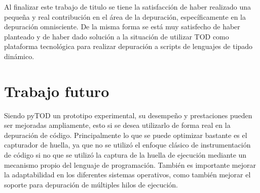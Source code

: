 \documentclass[12pt,legalpaper]{report}
\begin{document}
Al finalizar este trabajo de titulo se tiene la satisfacción de haber realizado una pequeña y real contribución en el área de la depuración, específicamente en la depuración omnisciente.  De la misma forma se está muy satisfecho de haber planteado y de haber dado solución a la situación de utilizar TOD como plataforma tecnológica para realizar depuración a scripts de lenguajes de tipado dinámico.

\chapter{Trabajo futuro}

Siendo pyTOD un prototipo experimental, su desempeño y prestaciones pueden ser mejoradas ampliamente, esto si se desea utilizarlo de forma real en la depuración de código.  Principalmente lo que se puede optimizar bastante es el capturador de huella, ya que no se utilizó el enfoque clásico de instrumentación de código si no que se utilizó la captura de la huella de ejecución mediante un mecanismo propio del lenguaje de programación.  También es importante mejorar la adaptabilidad en los diferentes sistemas operativos, como también mejorar el soporte para depuración de múltiples hilos de ejecución. 

\newpage
\end{document}
